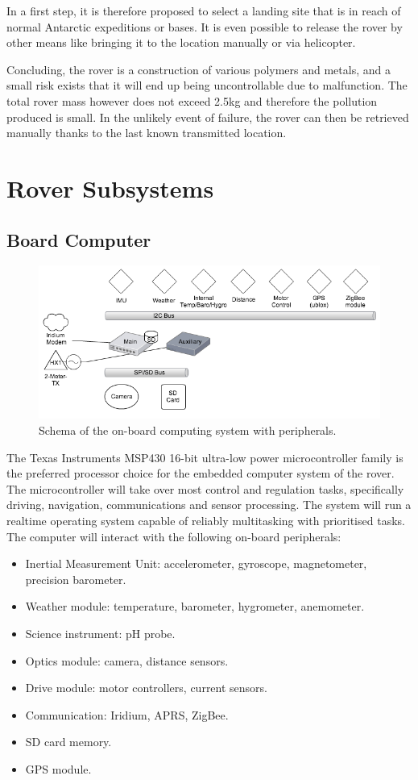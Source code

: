 \documentclass[a4paper,12pt]{article}
\begin{document}
In a first step, it is therefore proposed to select a landing site that is in reach of normal Antarctic expeditions or bases. It is even possible to release the rover by other means like bringing it to the location manually or via helicopter.

Concluding, the rover is a construction of various polymers and metals, and a small risk exists that it will end up being uncontrollable due to malfunction. The total rover mass however does not exceed 2.5kg and therefore the pollution produced is small. In the unlikely event of failure, the rover can then be retrieved manually thanks to the last known transmitted location.




\section{Rover Subsystems}

\subsection{Board Computer}
\begin{figure}[h!]
	\centering
    \includegraphics[width=1\textwidth]{schema}
    \caption{Schema of the on-board computing system with peripherals.}
\end{figure} 
The Texas Instruments MSP430 16-bit ultra-low power microcontroller family is the preferred processor choice for the embedded computer system of the rover. The microcontroller will take over most control and regulation tasks, specifically driving, navigation, communications and sensor processing. The system will run a realtime operating system capable of reliably multitasking with prioritised tasks. The computer will interact with the following on-board peripherals:

\begin{itemize}
\item Inertial Measurement Unit: accelerometer, gyroscope, magnetometer, precision barometer.
\item Weather module: temperature, barometer, hygrometer, anemometer.
\item Science instrument: pH probe.
\item Optics module: camera, distance sensors.
\item Drive module: motor controllers, current sensors.
\item Communication: Iridium, APRS, ZigBee.
\item SD card memory.
\item GPS module.
\end{itemize}
\end{document}
